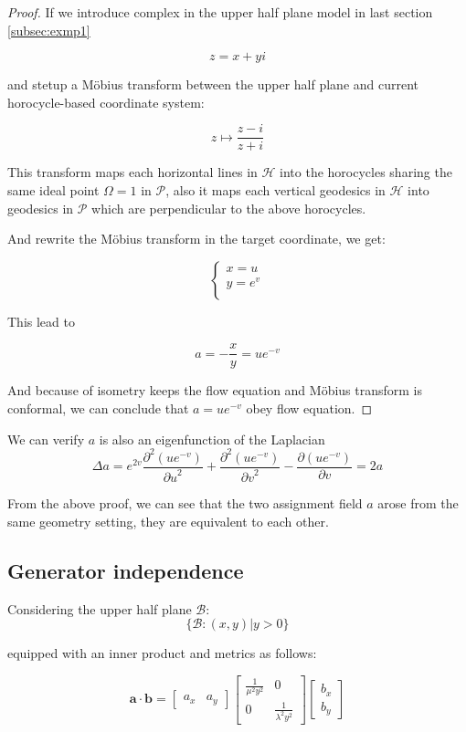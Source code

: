 \begin{proof}

If we introduce complex in the upper half plane model in last section \ref{subsec:exmp1}

$$
z = x + y i
$$

and stetup a Möbius transform between the upper half plane and current horocycle-based coordinate system:

$$
z \mapsto \frac{z-i}{z+i}
$$

This transform maps each horizontal lines in $\mathcal{H}$ into the horocycles sharing the same ideal point $\Omega = 1$ in $\mathcal{P}$,
also it maps each vertical geodesics in $\mathcal{H}$ into geodesics in $\mathcal{P}$ which are perpendicular to the above horocycles.

And rewrite the Möbius transform in the target coordinate, we get:

$$
\begin{cases}
x = u\\
y = e^v \\
\end{cases}
$$

This lead to

$$
a = -\frac{x}{y} = u e^{-v}
$$

And because of isometry keeps the flow equation and Möbius transform is conformal, we can conclude that $a = u e^{-v}$ obey flow equation.

\end{proof}

We can verify $a$ is also an eigenfunction of the Laplacian
$$
\Delta a = e^{2v} \frac{\partial^2(u e^{-v})}{{\partial u}^2} + \frac{\partial^2(u e^{-v})}{{\partial v}^2} - \frac{\partial(u e^{-v})}{\partial v} = 2a
$$

From the above proof, we can see that the two assignment field $a$ arose from the same geometry setting, they are equivalent to each other.

\subsection{Generator independence}

Considering the upper half plane $\mathcal{B}$:
$$
\{\mathcal{B}: (x, y) | y > 0 \}
$$

equipped with an inner product and metrics as follows:

$$
\mathbf{a} \cdot \mathbf{b} = \begin{bmatrix} a_x & a_y \end{bmatrix} \begin{bmatrix} \frac{1}{\mu^2 y^2} & 0 \\ 0 & \frac{1}{\lambda^2 y^2} \end{bmatrix} \begin{bmatrix} b_x \\ b_y \end{bmatrix}
$$

